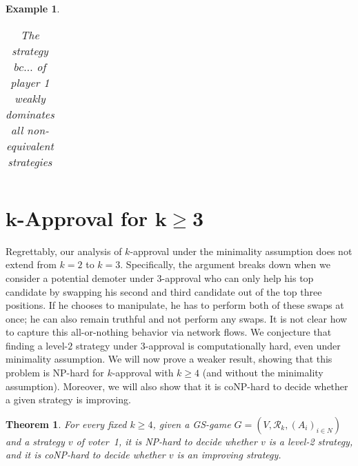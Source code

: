 \documentclass[11pt]{article}
\newtheorem{theorem}{Theorem}%
\newtheorem{example}{Example}
\newcommand{\calR}{\mathcal{R}}
\begin{document}
\begin{example}
{\begin{table}[h]
\begin{center}
\begin{tabular}{c|c|c|c|c|c|c}
\end{tabular}
\caption{The strategy $bc\dots$ of player 1 weakly dominates all non-equivalent strategies
}\label{table:non-min}
\end{center}
\end{table}
}
\end{example}

\section{$\boldsymbol{k}$-Approval for $\boldsymbol{k\ge 3}$}\label{sec:hard}
Regrettably, our analysis of $k$-approval under the minimality assumption does not extend 
from $k=2$ to $k=3$. Specifically, the argument breaks down when we consider a potential demoter
under 3-approval who can only help his top candidate by swapping his second and third candidate 
out of the top three positions. If he chooses to manipulate, he has to perform both 
of these swaps at once; he can also remain truthful and not perform any swaps. 
It is not clear how to capture this all-or-nothing behavior via network flows.
We conjecture that finding a level-$2$ strategy under $3$-approval is computationally hard,  
even under minimality assumption. We will now prove a weaker result, showing that
this problem is NP-hard for $k$-approval with $k\ge 4$ (and without the minimality assumption).
Moreover, we will also show that it is coNP-hard to decide whether a given strategy is improving.

\begin{theorem}\label{thm:4app}
For every fixed $k\ge 4$, 
given a GS-game $G=(V, \calR_k, (A_i)_{i\in N})$ and a strategy $v$
of voter~1, it is {\em NP}-hard to decide whether $v$ is a level-2 strategy, 
and it is {\em coNP}-hard to decide whether $v$ is an improving strategy. 
\end{theorem}
\end{document}
